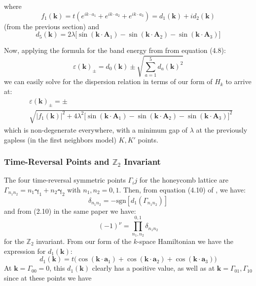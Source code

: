 \documentclass[10pt,a4paper]{article}\usepackage[]{graphicx}\usepackage[]{color}
\begin{document}
\begin{multicols}{2}
\vspace{-1cm}

\begin{center}
where 
$$f_1(\mathbf{k})=t(e^{ik\cdot a_1}+e^{ik\cdot a_2}+e^{ik\cdot a_3})=d_1(\mathbf{k})+id_2(\mathbf{k})$$
(from the previous section) and 
$$d_5(\mathbf{k})=2\lambda\big[\sin(\mathbf{k}\cdot\mathbf{A}_1)-\sin(\mathbf{k}\cdot\mathbf{A}_2)-\sin(\mathbf{k}\cdot\mathbf{A}_3)\big]$$
\end{center}
Now, applying the formula for the band energy from \cite{aa} from equation (4.8):
$$
\varepsilon(\mathbf{k})_{\pm}= d_0(\mathbf{k})\pm \sqrt{\sum_{a=1}^5d_a(\mathbf{k})^2}
$$
we can easily solve for the dispersion relation in terms of our form of $H_k$ to arrive at:
\footnotesize	
\begin{align*}
&\varepsilon(\mathbf{k})_{\pm}=\pm\\ &\sqrt{|f_1(\mathbf{k})|^2+4\lambda^2\big[\sin(\mathbf{k}\cdot\mathbf{A}_1)-\sin(\mathbf{k}\cdot\mathbf{A}_2)-\sin(\mathbf{k}\cdot\mathbf{A}_3)\big]^2}
\end{align*}
\normalsize
which is non-degenerate everywhere, with a minimum gap of $\lambda$ at the previously gapless (in the first neighbors model) $K,K'$ points.

\subsubsection{Time-Reversal Points and $\mathbb{Z}_2$ Invariant}
The four time-reversal symmetric points $\Gamma_ij$ for the honeycomb lattice are 
$\Gamma_{n_1 n_2}=n_1 \mathbf{\gamma}_1+n_2\mathbf{\gamma}_2$ with $n_1,n_2 = 0,1$. Then, from equation (4.10) of \cite{aa}, we have:
$$
\delta_{n_1 n_2} = -\text{sgn}\left[d_1(\Gamma_{n_1 n_2})\right]
$$
and from (2.10) in the same paper we have:
$$
(-1)^{\nu}=\prod_{n_1,n_2}^{0,1}\delta_{n_1 n_2}
$$
for the $\mathbb{Z}_2$ invariant.
From our form of the $k$-space Hamiltonian we have the expression for $d_1(\mathbf{k})$:
$$
d_1(\mathbf{k})= t\big(\cos(\mathbf{k}\cdot\mathbf{a}_1)+\cos(\mathbf{k}\cdot\mathbf{a}_2)+\cos(\mathbf{k}\cdot\mathbf{a}_3)\big)
$$
At $\mathbf{k}=\Gamma_{00}=0$, this $d_1(\mathbf{k})$ clearly has a positive value, as well as at $\mathbf{k}=\Gamma_{01},\Gamma_{10}$ since at these points we have


\end{multicols}
\end{document}
